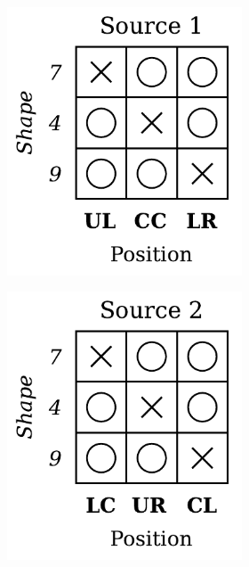 \begin{dataset}
\begin{figure}[H]
\begin{subfigure}[b]{0.45\textwidth}
\begin{subfigure}[b]{0.48\textwidth}
                \includegraphics[width=\textwidth]{img/datasets/ZGO_fact=pos_env=0.pdf}
            \end{subfigure}
            \begin{subfigure}[b]{0.48\textwidth}
                \centering
                \includegraphics[width=\textwidth]{img/datasets/ZGO_fact=pos_env=1.pdf}

\end{subfigure}
\end{subfigure}
\end{figure}
\end{dataset}
